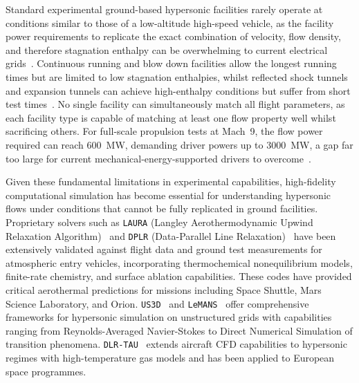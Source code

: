 Standard experimental ground-based hypersonic facilities rarely operate at conditions similar to those of a low-altitude high-speed vehicle, as the facility power requirements to replicate the exact combination of velocity, flow density, and therefore stagnation enthalpy can be overwhelming to current electrical grids~\citep{Passiatoreetal2021}. Continuous running and blow down facilities allow the longest running times but are limited to low stagnation enthalpies, whilst reflected shock tunnels and expansion tunnels can achieve high-enthalpy conditions but suffer from short test times~\citep{GuOlivier2020}. No single facility can simultaneously match all flight parameters, as each facility type is capable of matching at least one flow property well whilst sacrificing others. For full-scale propulsion tests at Mach~9, the flow power required can reach 600~MW, demanding driver powers up to 3000~MW, a gap far too large for current mechanical-energy-supported drivers to overcome~\citep{JiangYu2017}.

Given these fundamental limitations in experimental capabilities, high-fidelity computational simulation has become essential for understanding hypersonic flows under conditions that cannot be fully replicated in ground facilities. Proprietary solvers such as \texttt{LAURA} (Langley Aerothermodynamic Upwind Relaxation Algorithm)~\citep{Cheatwood1996} and \texttt{DPLR} (Data-Parallel Line Relaxation)~\citep{Candler1994} have been extensively validated against flight data and ground test measurements for atmospheric entry vehicles, incorporating thermochemical nonequilibrium models, finite-rate chemistry, and surface ablation capabilities. These codes have provided critical aerothermal predictions for missions including Space Shuttle, Mars Science Laboratory, and Orion. \texttt{US3D}~\citep{Nompelis2004} and \texttt{LeMANS}~\citep{Scalabrin2005} offer comprehensive frameworks for hypersonic simulation on unstructured grids with capabilities ranging from Reynolds-Averaged Navier-Stokes to Direct Numerical Simulation of transition phenomena. \texttt{DLR-TAU}~\citep{Mack2002} extends aircraft CFD capabilities to hypersonic regimes with high-temperature gas models and has been applied to European space programmes.



